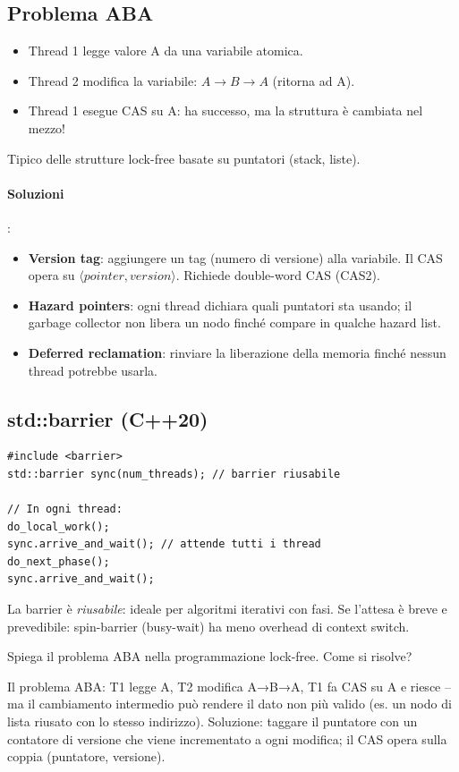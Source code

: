 \documentclass[11pt,a4paper]{article}
\theoremstyle{remark}
\newenvironment{esercizio}[1][]{%
  \begin{tcolorbox}[breakable,title={\textbf{Esercizio / Domanda d'esame}\ifx&#1&\else: #1\fi},
    colback=yellow!5!white, colframe=orange!75!black, fonttitle=\small\bfseries]%
}{%
  \end{tcolorbox}%
}
\newenvironment{risposta}{%
  \begin{tcolorbox}[breakable,title={\textbf{Risposta}},
    colback=green!5!white, colframe=green!50!black, fonttitle=\small\bfseries]%
}{%
  \end{tcolorbox}%
}
\begin{document}
\subsection{Problema ABA}

\begin{itemize}
  \item Thread 1 legge valore A da una variabile atomica.
  \item Thread 2 modifica la variabile: $A \to B \to A$ (ritorna ad A).
  \item Thread 1 esegue CAS su A: ha successo, ma la struttura è cambiata nel mezzo!
\end{itemize}

Tipico delle strutture lock-free basate su puntatori (stack, liste).

\paragraph{Soluzioni}:
\begin{itemize}
  \item \textbf{Version tag}: aggiungere un tag (numero di versione) alla variabile. Il CAS opera su $\langle pointer, version\rangle$. Richiede double-word CAS (CAS2).
  \item \textbf{Hazard pointers}: ogni thread dichiara quali puntatori sta usando; il garbage collector non libera un nodo finché compare in qualche hazard list.
  \item \textbf{Deferred reclamation}: rinviare la liberazione della memoria finché nessun thread potrebbe usarla.
\end{itemize}

\subsection{std::barrier (C++20)}

\begin{lstlisting}
#include <barrier>
std::barrier sync(num_threads); // barrier riusabile

// In ogni thread:
do_local_work();
sync.arrive_and_wait(); // attende tutti i thread
do_next_phase();
sync.arrive_and_wait();
\end{lstlisting}

La barrier è \emph{riusabile}: ideale per algoritmi iterativi con fasi.
Se l'attesa è breve e prevedibile: spin-barrier (busy-wait) ha meno overhead di context switch.

\begin{esercizio}
Spiega il problema ABA nella programmazione lock-free. Come si risolve?
\end{esercizio}
\begin{risposta}
Il problema ABA: T1 legge A, T2 modifica A→B→A, T1 fa CAS su A e riesce -- ma il cambiamento intermedio può rendere il dato non più valido (es. un nodo di lista riusato con lo stesso indirizzo). Soluzione: taggare il puntatore con un contatore di versione che viene incrementato a ogni modifica; il CAS opera sulla coppia (puntatore, versione).
\end{risposta}
\end{document}

